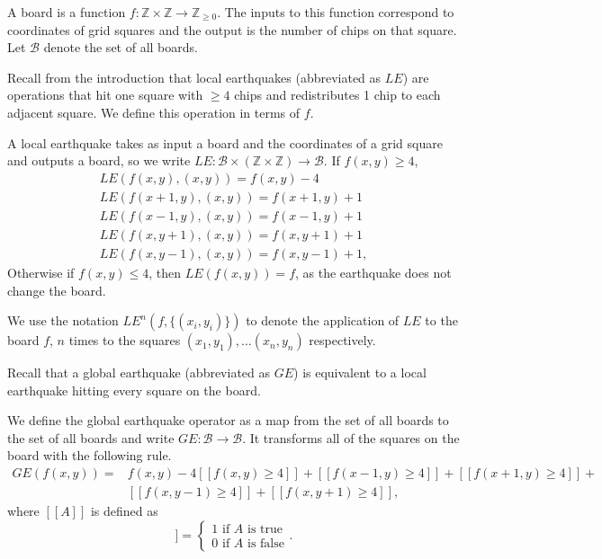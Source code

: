 \documentclass[runningheads,a4paper]{llncs}
\begin{document}
\begin{definition} A board is a function $f: \mathbb{Z} \times \mathbb{Z} \to \mathbb{Z}_{\geq 0}$.
The inputs to this function correspond to coordinates of grid squares and the output is the number of chips on that square. Let $\mathcal{B}$ denote the set of all boards.
\end{definition}

Recall from the introduction that local earthquakes (abbreviated as $LE$) are operations that hit one square with $\geq 4$ chips and redistributes 1 chip to each adjacent square. We define this operation in terms of $f$.

\begin{definition}
A local earthquake takes as input a board and the coordinates of a grid square and outputs a board, so we write $LE: \mathcal{B} \times (\mathbb{Z} \times \mathbb{Z}) \rightarrow \mathcal{B}$. If $f(x,y) \geq 4$,
\begin{align*}
LE( f(x,y), (x,y)) = f(x,y)-4 \\
LE( f(x+1,y), (x,y)) = f(x+1,y)+1 \\
LE( f(x-1,y), (x,y)) = f(x-1,y)+1 \\
LE( f(x,y+1), (x,y)) = f(x,y+1)+1 \\
LE( f(x,y-1), (x,y)) = f(x,y-1)+1,
\end{align*}
Otherwise if $f(x,y) \leq 4$, then $LE(f(x,y)) = f$, as the earthquake does not change the board.
\end{definition}
We use the notation $LE^n(f, \{(x_i,y_i)\})$ to denote the application of $LE$ to the board $f$, $n$ times to the squares $(x_1, y_1), \ldots (x_{n}, y_{n})$ respectively. 

Recall that a global earthquake (abbreviated as $GE$) is equivalent to a local earthquake hitting every square on the board.

\begin{definition} We define the global earthquake operator as a map from the set of all boards to the set of all boards and write $GE: \mathcal{B} \rightarrow \mathcal{B}$. 
It transforms all of the squares on the board with the following rule.
\begin{align*}
GE(f(x,y)) = &f(x,y) - 4[[f(x,y) \geq 4]] + [[f(x-1,y) \geq 4]] + [[f(x+1,y) \geq 4]] + \\
&[[f(x,y-1) \geq 4]] + [[f(x,y+1) \geq 4]],
\end{align*}
where $[[A]]$ is defined as 
\begin{equation}
[[A]] = 
\begin{cases} 
1 \text{ if } A \text{ is true} \\ 
0 \text{ if } A  \text{ is false}
 \end{cases}.
\end{equation}
\end{definition}
\end{document}
